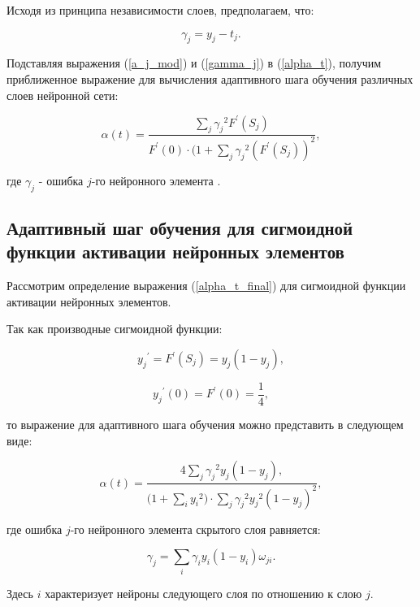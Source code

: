 Исходя из принципа независимости слоев, предполагаем, что:

\begin{equation}\label{gamma_j}
    \gamma_j = y_j - t_j.
\end{equation}

Подставляя выражения (\ref{a_j_mod}) и (\ref{gamma_j}) в (\ref{alpha_t}), получим приближенное выражение для вычисления адаптивного шага обучения различных слоев нейронной сети:

\begin{equation}\label{alpha_t_final}
    \alpha(t) = \frac{\sum_{j}{{\gamma_j}^2F^\prime(S_j)}}{F^\prime(0)\cdot(1 + \sum_{j}{{\gamma_j}^2(F^\prime(S_j))^2}},
\end{equation}

где $\gamma_j$ - ошибка $j$-го нейронного элемента \cite{Golovko_2001}.

\subsection{Адаптивный шаг обучения для сигмоидной функции активации нейронных элементов}

Рассмотрим определение выражения (\ref{alpha_t_final}) для сигмоидной функции активации нейронных элементов.

Так как производные сигмоидной функции:

\begin{equation}
    {y_j}^\prime = F^\prime(S_j) = y_j(1 - y_j),
\end{equation}

\begin{equation}
    {y_j}^\prime(0) = F^\prime(0) = \frac{1}{4},
\end{equation}

то выражение для адаптивного шага обучения можно представить в следующем виде:

\begin{equation}
    \alpha(t) = \frac{4\sum_{j}{{\gamma_j}^2y_j(1 - y_j),}}{(1 + \sum_{i}{{y_i}^2)\cdot\sum_{j}{{\gamma_j}^2{y_j}^2(1 - y_j)^2}}},
\end{equation}

где ошибка $j$-го нейронного элемента скрытого слоя равняется:

\begin{equation}
    \gamma_j = \sum_{i}\gamma_i y_i(1 - y_i)\omega_{j i}.
\end{equation}

Здесь $i$ характеризует нейроны следующего слоя по отношению к слою $j$.

